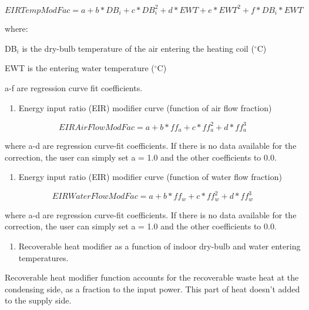 \begin{equation}
EIRTempModFac = a + b*D{B_i} + c*DB_i^2 + d*EWT + e*EW{T^2} + f*D{B_i}*EWT
\end{equation}

where:

DB\(_{i}\) is the dry-bulb temperature of the air entering the heating coil (\(^{\circ}\)C)

EWT is the entering water temperature (\(^{\circ}\)C)

a-f are regression curve fit coefficients.

\begin{enumerate}
\def\labelenumi{\arabic{enumi})}
\setcounter{enumi}{4}
\tightlist
\item
  Energy input ratio (EIR) modifier curve (function of air flow fraction)
\end{enumerate}

\begin{equation}
EIRAirFlowModFac = a + b*f{f_a} + c*ff_a^2 + d*ff_a^3
\end{equation}

where a-d are regression curve-fit coefficients.  If there is no data available for the correction, the user can simply set a = 1.0 and the other coefficients to 0.0.

\begin{enumerate}
\def\labelenumi{\arabic{enumi})}
\setcounter{enumi}{5}
\tightlist
\item
  Energy input ratio (EIR) modifier curve (function of water flow fraction)
\end{enumerate}

\begin{equation}
EIRWaterFlowModFac = a + b*f{f_w} + c*ff_w^2 + d*ff_w^3
\end{equation}

where a-d are regression curve-fit coefficients.  If there is no data available for the correction, the user can simply set a = 1.0 and the other coefficients to 0.0.

\begin{enumerate}
\def\labelenumi{\arabic{enumi})}
\setcounter{enumi}{6}
\tightlist
\item
  Recoverable heat modifier as a function of indoor dry-bulb and water entering temperatures.
\end{enumerate}

Recoverable heat modifier function accounts for the recoverable waste heat at the condensing side, as a fraction to the input power. This part of heat doesn't added to the supply side.

